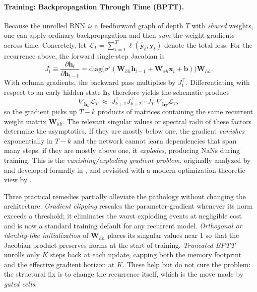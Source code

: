 \documentclass[11pt,a4paper]{report}
\newcommand{\x}{\bm{x}}
\newcommand{\h}{\bm{h}}
\newcommand{\y}{\bm{y}}
\newcommand{\bb}{\bm{b}}
\newcommand{\Wh}{\bm{W}_{hh}}
\newcommand{\Wx}{\bm{W}_{xh}}
\begin{document}
\paragraph{Training: Backpropagation Through Time (BPTT).}  Because the unrolled RNN \emph{is} a feedforward graph of depth $T$ with \emph{shared} weights, one can apply ordinary backpropagation and then \emph{sum} the weight-gradients across time.  Concretely, let $\mathcal{L}_T = \sum_{t=1}^{T}\ell(\hat{\y}_t, \y_t)$ denote the total loss.  For the recurrence above, the forward single-step Jacobian is
\[
J_t \equiv \frac{\partial \h_t}{\partial \h_{t-1}}
= \mathrm{diag}\!\bigl(\sigma'(\Wh\h_{t-1}+\Wx\x_t+\bb)\bigr)\Wh.
\]
With column gradients, the backward pass multiplies by $J_t^\top$.  Differentiating with respect to an early hidden state $\h_k$ therefore yields the schematic product
\begin{equation}\label{eq:bptt}
\nabla_{\h_k}\mathcal{L}_T
\;\approx\;
J_{k+1}^{\top}J_{k+2}^{\top}\cdots J_T^{\top}\,\nabla_{\h_T}\mathcal{L}_T,
\end{equation}
so the gradient picks up $T-k$ products of matrices containing the same recurrent weight matrix $\Wh$.  The relevant singular values or spectral radii of these factors determine the asymptotics.  If they are mostly below one, the gradient \emph{vanishes} exponentially in $T-k$ and the network cannot learn dependencies that span many steps; if they are mostly above one, it \emph{explodes}, producing NaNs during training.  This is the \emph{vanishing/exploding gradient problem}, originally analyzed by \citet{hochreiter1991untersuchungen} and developed formally in \citet{bengio1994learning, hochreiter2001gradient}, and revisited with a modern optimization-theoretic view by \citet{pascanu2013difficulty}.

Three practical remedies partially alleviate the pathology without changing the architecture.  \emph{Gradient clipping} \citep{pascanu2013difficulty} rescales the parameter-gradient whenever its norm exceeds a threshold; it eliminates the worst exploding events at negligible cost and is now a standard training default for any recurrent model.  \emph{Orthogonal or identity-like initialization} of $\Wh$ places its singular values near $1$ so that the Jacobian product preserves norms at the start of training.  \emph{Truncated BPTT} unrolls only $K$ steps back at each update, capping both the memory footprint and the effective gradient horizon at $K$.  These help but do not cure the problem: the structural fix is to change the recurrence itself, which is the move made by \emph{gated cells}.
\end{document}
